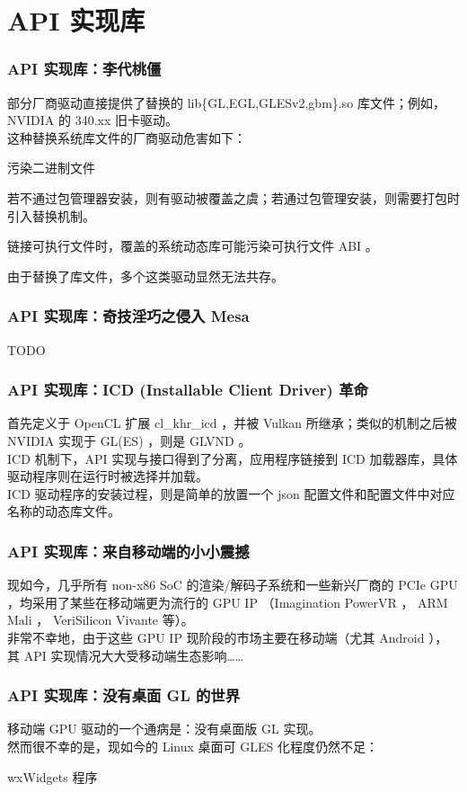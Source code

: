 \documentclass{ctexbeamer}
\begin{document}
\section{API 实现库}

\begin{frame}
    \frametitle{API 实现库：李代桃僵}
    部分厂商驱动直接提供了替换的 lib\{GL,EGL,GLESv2,gbm\}.so 库文件；例如， NVIDIA 的 340.xx 旧卡驱动。\\
    这种替换系统库文件的厂商驱动危害如下：\\
    \begin{labeling}{污染二进制文件}
        \item [污染包管理器] 若不通过包管理器安装，则有驱动被覆盖之虞；若通过包管理安装，则需要打包时引入替换机制。
        \item [污染二进制文件] 链接可执行文件时，覆盖的系统动态库可能污染可执行文件 ABI 。
        \item [无法共存] 由于替换了库文件，多个这类驱动显然无法共存。
    \end{labeling}
\end{frame}

\begin{frame}
    \frametitle{API 实现库：奇技淫巧之侵入 Mesa}
    TODO
\end{frame}

\begin{frame}
    \frametitle{API 实现库：ICD (Installable Client Driver) 革命}
    首先定义于 OpenCL 扩展 cl\_khr\_icd ，并被 Vulkan 所继承；类似的机制之后被 NVIDIA 实现于 GL(ES) ，则是 GLVND 。\\
    ICD 机制下，API 实现与接口得到了分离，应用程序链接到 ICD 加载器库，具体驱动程序则在运行时被选择并加载。\\
    ICD 驱动程序的安装过程，则是简单的放置一个 json 配置文件和配置文件中对应名称的动态库文件。
\end{frame}

\begin{frame}
    \frametitle{API 实现库：来自移动端的小小震撼}
    现如今，几乎所有 non-x86 SoC 的渲染/解码子系统和一些新兴厂商的 PCIe GPU ，均采用了某些在移动端更为流行的 GPU IP （Imagination PowerVR ， ARM Mali ， VeriSilicon Vivante 等）。\\
    非常不幸地，由于这些 GPU IP 现阶段的市场主要在移动端（尤其 Android ），其 API 实现情况大大受移动端生态影响……
\end{frame}

\begin{frame}
    \frametitle{API 实现库：没有桌面 GL 的世界}
    移动端 GPU 驱动的一个通病是：没有桌面版 GL 实现。\\
    然而很不幸的是，现如今的 Linux 桌面可 GLES 化程度仍然不足：\\
    \begin{labeling}{wxWidgets 程序}
        \item [wxWidgets 程序]
    \end{labeling}
\end{frame}
\end{document}
